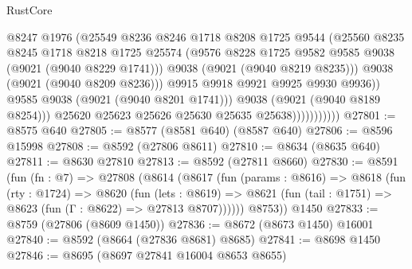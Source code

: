 \begin{lexlean}{RustCore}
\begin{coremodule}
                                  @8247
                                  @1976
                                  (@25549
                                    @8236
                                    @8246
                                    @1718
                                    @8208
                                    @1725
                                    @9544
                                    (@25560
                                      @8235
                                      @8245
                                      @1718
                                      @8218
                                      @1725
                                      @25574
                                      (@9576
                                        @8228
                                        @1725
                                        @9582
                                        @9585
                                        @9038
                                        (@9021 (@9040 @8229 @1741)))
                                      @9038
                                      (@9021 (@9040 @8219 @8235)))
                                    @9038
                                    (@9021 (@9040 @8209 @8236)))
                                  @9915
                                  @9918
                                  @9921
                                  @9925
                                  @9930
                                  @9936))
                              @9585
                              @9038
                              (@9021 (@9040 @8201 @1741)))
                            @9038
                            (@9021 (@9040 @8189 @8254)))
                          @25620
                          @25623
                          @25626
                          @25630
                          @25635
                          @25638)))))))))))
@27801 := @8575 @640
@27805 := @8577 (@8581 @640) (@8587 @640)
@27806 := @8596 @15998
@27808 := @8592 (@27806 @8611)
@27810 := @8634 (@8635 @640)
@27811 := @8630 @27810
@27813 := @8592 (@27811 @8660)
@27830 := @8591
    (fun (fn : @7) =>
    @27808
      (@8614
        (@8617
          (fun (params : @8616) =>
          @8618
            (fun (rty : @1724) =>
            @8620
              (fun (lets : @8619) =>
              @8621 (fun (tail : @1751) => @8623 (fun (Γ : @8622) => @27813 @8707))))))
        @8753))
    @1450
@27833 := @8759 (@27806 (@8609 @1450))
@27836 := @8672 (@8673 @1450) @16001
@27840 := @8592 (@8664 (@27836 @8681) @8685)
@27841 := @8698 @1450
@27846 := @8695 (@8697 @27841 @16004 @8653 @8655)

\end{coremodule}
\end{lexlean}
